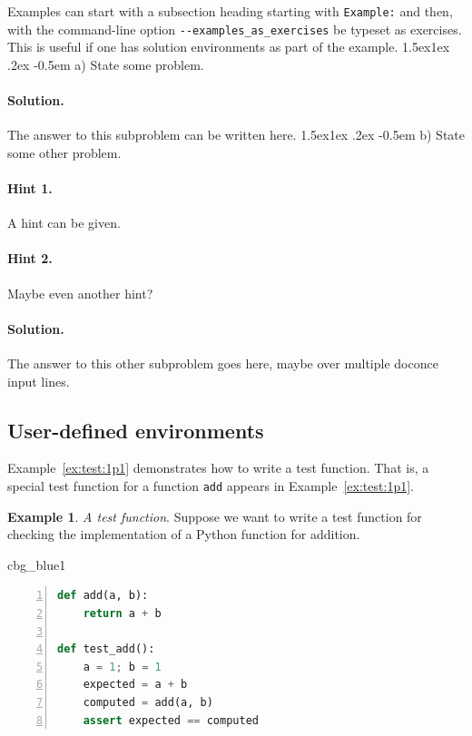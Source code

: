 \documentclass[%
oneside,                 %
final,                   %
10pt]{article}
\makeatletter
\newenvironment{_cod_tight}[1]{
   \def\FrameCommand{\colorbox{#1}}
   \FrameRule0.6pt\MakeFramed {\FrameRestore}\vskip3mm}
   {\vskip0mm\endMakeFramed}
\newenvironment{cod}[1]{
\bgroup\rmfamily
\fboxsep=0mm\relax
\begin{_cod_tight}{#1}
\list{}{\parsep=-2mm\parskip=0mm\topsep=0pt\leftmargin=2mm
\rightmargin=2\leftmargin\leftmargin=4pt\relax}
\item\relax}
{\endlist\end{_cod_tight}\egroup}
\newenvironment{doconceexercise}{}{}
\newcommand\subex{\@startsection{paragraph}{4}{\z@}%
                  {1.5ex\@plus1ex \@minus.2ex}%
                  {-0.5em}%
                  {\normalfont\normalsize\bfseries}}
\theoremstyle{definition}
\newtheorem{example}{Example}[section]
\makeatother
\begin{document}
\begin{enumerate}
\begin{doconceexercise}
\label{Example}
Examples can start with a subsection heading starting with \texttt{Example:}
and then, with the command-line option \Verb!--examples_as_exercises! be
typeset as exercises. This is useful if one has solution
environments as part of the example.
\subex{a)}
State some problem.
\paragraph{Solution.}
The answer to this subproblem can be written here.
\subex{b)}
State some other problem.
\paragraph{Hint 1.}
A hint can be given.
\paragraph{Hint 2.}
Maybe even another hint?
\paragraph{Solution.}
The answer to this other subproblem goes here,
maybe over multiple doconce input lines.
\end{doconceexercise}
\subsection{User-defined environments}
Example~\vref{ex:test:1p1} demonstrates how to write a test function.
That is, a special test function for a function \texttt{add} appears in
Example~\vref{ex:test:1p1}.
\begin{example}
\label{ex:test:1p1}
\noindent\emph{A test function}.
Suppose we want to write a test function for checking the
implementation of a Python function for addition.
\begin{cod}{cbg_blue1}\begin{lstlisting}[language=Python,style=myspeciallststyle,numbers=left,numberstyle=\tiny,stepnumber=3,numbersep=15pt,xleftmargin=1mm]
def add(a, b):
    return a + b

def test_add():
    a = 1; b = 1
    expected = a + b
    computed = add(a, b)
    assert expected == computed

\end{lstlisting}\end{cod}
\noindent


\end{example}
\end{enumerate}
\end{document}
